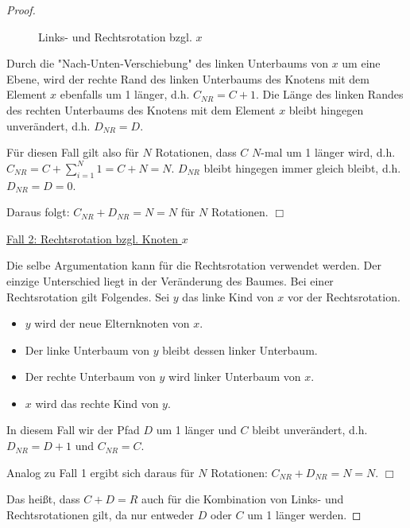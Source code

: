 \documentclass{article}
\begin{document}
\begin{proof}
\begin{figure}[H]
  \label{fig:aufg12-left-rot-x}
  \caption{Links- und Rechtsrotation bzgl. $x$}
\end{figure}

Durch die "Nach-Unten-Verschiebung" des linken Unterbaums von $x$ um eine Ebene,
wird der rechte Rand des linken Unterbaums des Knotens mit dem Element $x$
ebenfalls um 1 l{\"a}nger, d.h. $C_{NR} = C + 1$. Die L{\"a}nge des linken Randes
des rechten Unterbaums des Knotens mit dem Element $x$ bleibt hingegen
unver{\"a}ndert, d.h. $D_{NR} = D$.

F{\"u}r diesen Fall gilt also f{\"u}r $N$ Rotationen, dass $C$
$N$-mal um 1 l{\"a}nger wird, d.h.
$C_{NR} = C + \sum\limits_{i = 1}^{N} 1 = C + N = N$. $D_{NR}$ bleibt hingegen
immer gleich bleibt, d.h. $D_{NR} = D = 0$.

Daraus folgt: $C_{NR} + D_{NR} = N = N$ f{\"u}r $N$ Rotationen. \hfill$\Box$

\underline{Fall 2: Rechtsrotation bzgl. Knoten $x$}

Die selbe Argumentation kann f{\"u}r die Rechtsrotation verwendet werden. Der
einzige Unterschied liegt in der Ver{\"a}nderung des Baumes. Bei einer
Rechtsrotation gilt Folgendes. Sei $y$ das linke Kind von $x$ vor der
Rechtsrotation.
{\parskip0pt\begin{itemize}
  \item $y$ wird der neue Elternknoten von $x$.
  \item Der linke Unterbaum von $y$ bleibt dessen linker Unterbaum.
  \item Der rechte Unterbaum von $y$ wird linker Unterbaum von $x$.
  \item $x$ wird das rechte Kind von $y$.
\end{itemize}}

In diesem Fall wir der Pfad $D$ um 1 l{\"a}nger und $C$ bleibt unver{\"a}ndert,
d.h. $D_{NR} = D + 1$ und $C_{NR} = C$.

Analog zu Fall 1 ergibt sich daraus f{\"u}r $N$ Rotationen:
$C_{NR} + D_{NR} = N = N$. \hfill$\Box$

Das hei{\ss}t, dass $C + D = R$ auch f{\"u}r die Kombination von Links- und
Rechtsrotationen gilt, da nur entweder $D$ oder $C$ um 1 l{\"a}nger werden.
\end{proof}
\end{document}
